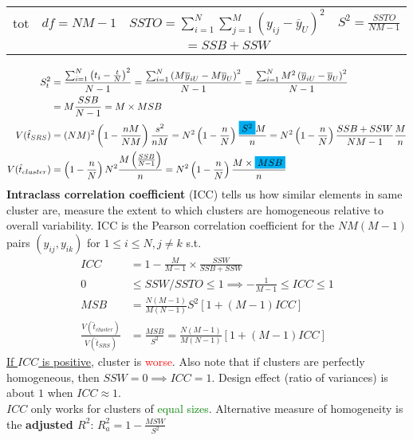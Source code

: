 \documentclass[landscape]{article}
\begin{document}
\begin{multicols*}{3}
\begin{tabular}{c | c c c}
  \\\hline tot & $df = NM - 1$ & $SSTO = \sum_{i=1}^N \sum_{j = 1}^{M} \left(y_{ij} - \overline{y}_U\right)^2$ & $S^2 = \frac{SSTO}{NM - 1}$
  \\ & & $ = SSB + SSW$
\end{tabular}
\begin{align*}
  S_t^2 & = \frac{\sum_{i=1}^N \left(t_i - \frac{t }{N}\right)^2}{N-1} = \frac{\sum_{i=1}^N \left(M \overline{y}_{iU} - M \overline{y}_U\right)^2}{N - 1} = \frac{\sum_{i=1}^N M^2 \left(\overline{y}_{iU} - \overline{y}_U\right)^2}{N-1}
  \\ & = M \frac{SSB}{N-1} = M \times MSB
  \\ V(\hat{t}_{SRS}) & = (NM)^2 \left(1 - \frac{nM}{NM}\right) \frac{s^2}{nM} = N^2 \left(1 - \frac{n}{N}\right) \frac{\colorbox{cyan}{$S^2$}M}{n} =
                        N^2 \left(1 - \frac{n}{N}\right) \frac{SSB + SSW}{NM - 1} \frac{M}{n}
  \\ V(\hat{t}_{cluster}) & = \left(1 - \frac{n}{N}\right) N^2 \frac{M \left(\frac{SSB}{N-1}\right)}{n} = N^2 \left(1 - \frac{n}{N}\right) \frac{M \times \colorbox{cyan}{$MSB$}}{n}
\end{align*}
\textbf{Intraclass correlation coefficient} (ICC) tells us how similar
elements in same cluster are, measure the extent to which clusters are
homogeneous relative to overall variability. ICC is the Pearson
correlation coefficient for the $NM(M - 1)$ pairs $(y_{ij}, y_{ik})$
for $1 \leq i \leq N, j \neq k$ s.t.\
\begin{align*}
  ICC & = 1 - \frac{M}{M-1} \times \frac{SSW}{SSB + SSW}
  \\ 0 & \leq SSW/SSTO \leq 1 \implies - \frac{1}{M-1} \leq ICC \leq 1
  \\ MSB & = \frac{N(M-1)}{M(N-1)}S^2 [1 + (M-1)ICC]
  \\ \frac{V(\hat{t}_{cluster})}{V(\hat{t}_{SRS})} & = \frac{MSB}{S^2}  = \frac{N(M-1)}{M(N-1)} [1 + (M-1) ICC]
\end{align*}
\underline{If $ICC$ is positive}, cluster is
\textcolor{red}{worse}. Also note that if clusters are perfectly
homogeneous, then $SSW = 0 \implies ICC = 1$. Design effect (ratio of
variances) is about $1$ when $ICC \approx 1$.
\\ $ICC$ only works for clusters of \textcolor{green}{equal
  sizes}. Alternative measure of homogeneity is the \textbf{adjusted
  $R^2$}: $ R_a^2 = 1 - \frac{MSW}{S^2}$

\end{multicols*}
\end{document}
